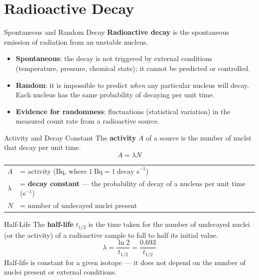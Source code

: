 \pagebreak


\section{Radioactive Decay}

\begin{definitionbox}{Spontaneous and Random Decay}
\textbf{Radioactive decay} is the spontaneous emission of radiation from an unstable nucleus.
\begin{itemize}[itemsep=2pt]
  \item \textbf{Spontaneous}: the decay is not triggered by external conditions (temperature, pressure, chemical state); it cannot be predicted or controlled.
  \item \textbf{Random}: it is impossible to predict \emph{when} any particular nucleus will decay. Each nucleus has the same probability of decaying per unit time.
  \item \textbf{Evidence for randomness}: fluctuations (statistical variation) in the measured count rate from a radioactive source.
\end{itemize}
\end{definitionbox}

\begin{definitionbox}{Activity and Decay Constant}
The \textbf{activity} $A$ of a source is the number of nuclei that decay per unit time.
$$A = \lambda N$$
\begin{tabular}{@{}ll@{}}
$A$ & = activity (Bq, where $1\ \text{Bq} = 1\ \text{decay s}^{-1}$) \\
$\lambda$ & = \textbf{decay constant} — the probability of decay of a nucleus per unit time (s$^{-1}$) \\
$N$ & = number of undecayed nuclei present \\
\end{tabular}
\end{definitionbox}

\begin{definitionbox}{Half-Life}
The \textbf{half-life} $t_{1/2}$ is the time taken for the number of undecayed nuclei (or the activity) of a radioactive sample to fall to half its initial value.
$$\lambda = \frac{\ln 2}{t_{1/2}} = \frac{0.693}{t_{1/2}}$$
Half-life is constant for a given isotope — it does not depend on the number of nuclei present or external conditions.
\end{definitionbox}

